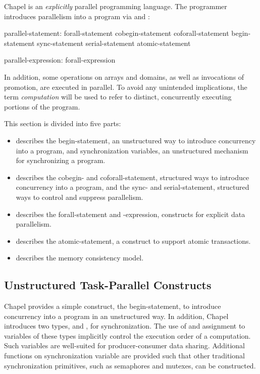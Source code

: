 \label{Parallelism_and_Synchronization}

Chapel is an {\em explicitly} parallel programming language.  The
programmer introduces parallelism into a program
via  and :
\begin{syntax}
parallel-statement:
  forall-statement
  cobegin-statement
  coforall-statement
  begin-statement
  sync-statement
  serial-statement
  atomic-statement

parallel-expression:
  forall-expression
\end{syntax}

In addition, some operations on arrays and domains, as well as
invocations of promotion, are executed in parallel.  To avoid any
unintended implications, the term \emph{computation} will be used to
refer to distinct, concurrently executing portions of the program.

This section is divided into five parts:
\begin{itemize}
\item {}
describes the begin-statement, an unstructured way to introduce
concurrency into a program, and synchronization variables, an
unstructured mechanism for synchronizing a program.
\item {}
describes the cobegin- and coforall-statement, structured ways to
introduce concurrency into a program, and the sync- and
serial-statement, structured ways to control and suppress parallelism.
\item {}
describes the forall-statement and -expression, constructs for
explicit data parallelism.
\item {}
describes the atomic-statement, a construct to support atomic
transactions.
\item {}
describes the memory consistency model.
\end{itemize}

\subsection{Unstructured Task-Parallel Constructs}
\label{unstructured_task_parallelism}

Chapel provides a simple construct, the begin-statement, to introduce
concurrency into a program in an unstructured way.  In addition,
Chapel introduces two types,  and , for
synchronization.  The use of and assignment to variables of these
types implicitly control the execution order of a computation.  Such
variables are well-suited for producer-consumer data sharing.
Additional functions on synchronization variable are provided such
that other traditional synchronization primitives, such as semaphores
and mutexes, can be constructed.

